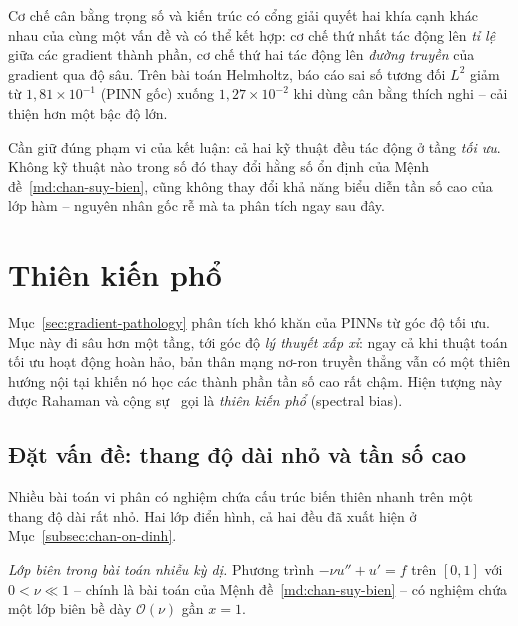 \begin{nhanxet}
\label{nx:hai-huong-bo-tro}
Cơ chế cân bằng trọng số và kiến trúc có cổng giải quyết hai khía cạnh khác nhau
của cùng một vấn đề và có thể kết hợp: cơ chế thứ nhất tác động lên \emph{tỉ lệ}
giữa các gradient thành phần, cơ chế thứ hai tác động lên \emph{đường truyền} của
gradient qua độ sâu. Trên bài toán Helmholtz, \cite{wang2021} báo cáo sai số
tương đối $L^2$ giảm từ $1{,}81\times10^{-1}$ (PINN gốc) xuống
$1{,}27\times10^{-2}$ khi dùng cân bằng thích nghi -- cải thiện hơn một bậc độ
lớn.
 
Cần giữ đúng phạm vi của kết luận: cả hai kỹ thuật đều tác động ở tầng
\emph{tối ưu}. Không kỹ thuật nào trong số đó thay đổi hằng số ổn định của
Mệnh đề~\ref{md:chan-suy-bien}, cũng không thay đổi khả năng biểu diễn tần số cao
của lớp hàm -- nguyên nhân gốc rễ mà ta phân tích ngay sau đây.
\end{nhanxet}
 
\section{Thiên kiến phổ}
\label{sec:spectral-bias}
 
Mục~\ref{sec:gradient-pathology} phân tích khó khăn của PINNs từ góc độ tối ưu.
Mục này đi sâu hơn một tầng, tới góc độ \emph{lý thuyết xấp xỉ}: ngay cả khi
thuật toán tối ưu hoạt động hoàn hảo, bản thân mạng nơ-ron truyền thẳng vẫn có
một thiên hướng nội tại khiến nó học các thành phần tần số cao rất chậm. Hiện
tượng này được Rahaman và cộng sự~\cite{rahaman2019} gọi là \emph{thiên kiến phổ}
(spectral bias).
 
\subsection{Đặt vấn đề: thang độ dài nhỏ và tần số cao}
\label{subsec:thang-do-dai}
 
Nhiều bài toán vi phân có nghiệm chứa cấu trúc biến thiên nhanh trên một thang độ
dài rất nhỏ. Hai lớp điển hình, cả hai đều đã xuất hiện ở
Mục~\ref{subsec:chan-on-dinh}.
 
\emph{Lớp biên trong bài toán nhiễu kỳ dị.} Phương trình $-\nu u'' + u' = f$ trên
$[0,1]$ với $0 < \nu \ll 1$ -- chính là bài toán của
Mệnh đề~\ref{md:chan-suy-bien} -- có nghiệm chứa một lớp biên bề dày
$\mathcal{O}(\nu)$ gần $x = 1$.
 
